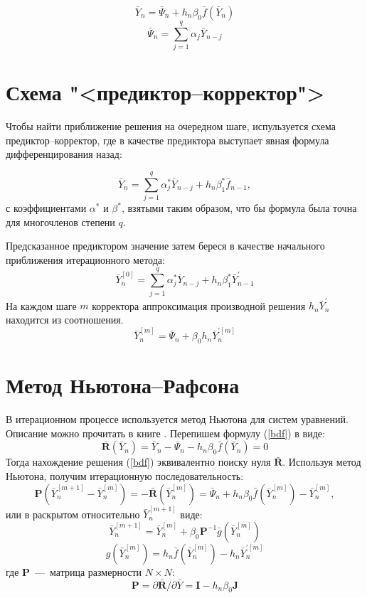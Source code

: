 \documentclass[oneside,final,14pt]{extreport}
\begin{document}
\begin{equation}
\label{bdf}
	\bar Y_n=\bar\Psi_n+h_n\beta_0\bar f(\bar Y_n)
\end{equation}
\begin{equation}
\label{psi}
	\bar \Psi_n=\sum_{j=1}^{q} \alpha_j\bar Y_{n-j}
\end{equation}

\section{Схема "<предиктор--корректор">}
Чтобы найти приближение решения на очередном шаге, испульзуется схема предиктор--корректор, где в качестве предиктора выступает явная формула дифференцирования назад:

\[\bar Y_n=\sum_{j=1}^{q} \alpha_j^*\bar Y_{n-j}+h_n\beta_1^*\bar f_{n-1},\]
с коэффициентами \(\alpha^*\) и \(\beta^*\), взятыми таким образом, что бы формула была точна для многочленов степени \(q\).

Предсказанное предиктором значение затем береся в качестве начального приближения итерационного метода:
\[\bar Y_n^{[0]}=\sum_{j=1}^{q} \alpha_j^*\bar Y_{n-j}+h_n\beta_1^*\bar Y_{n-1}^{'}\]
 На каждом шаге \(m\) корректора аппроксимация производной решения \(h_n\bar Y_n^{'}\) находится из соотношения.
\begin{equation}
\bar Y_n^{[m]}=\bar\Psi_n+\beta_0 h_n\bar Y_n^{'[m]}
\end{equation}

\section{Метод Ньютона--Рафсона}
В итерационном процессе используется метод Ньютона для систем уравнений. Описание можно прочитать в книге \cite{andreev}. Перепишем формулу (\ref{bdf}) в виде:
\[
\mathbf{\bar R}(\bar Y_n)= \bar Y_n-\bar\Psi_n-h_n\beta_0\bar f(\bar Y_n)=0
\]
Тогда нахождение решения (\ref{bdf}) эквивалентно поиску нуля \(\mathbf{\bar R}\). Используя метод Ньютона, получим итерационную последовательность:
\[
\mathbf P(\bar Y_n^{[m+1]}-\bar Y_n^{[m]})=-\mathbf{\bar R}(\bar Y_n^{[m]})=\bar\Psi_n+h_n\beta_0\bar f(\bar Y_n^{[m]})-\bar Y_n^{[m]}
,\]
или в раскрытом относительно \(\bar Y_n^{[m+1]}\) виде:
\begin{equation}
\label{newton}
\bar Y_n^{[m+1]}=\bar Y_n^{[m]}+\beta_0\mathbf P^{-1}\bar g(\bar Y_n^{[m]})
\end{equation}
\[
g(\bar Y_n^{[m]})=h_n\bar f(\bar Y_n^{[m]})-h_n\bar Y_n^{'[m]}
\]
где \(\mathbf P\)~---~матрица размерности \(N\times N\):
\[
\mathbf P=\partial\mathbf{\bar R} / \partial\bar Y=\mathbf I-h_n\beta_0 \mathbf J
\]
\end{document}
